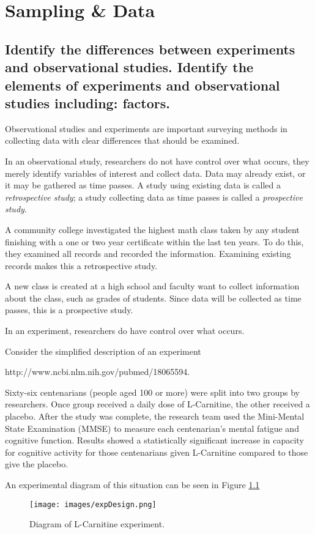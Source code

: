 \chapter{Sampling \& Data}

\section[Experiments \& Studies]{Identify the differences between experiments and observational studies. Identify the elements of experiments and observational studies including: factors.}

Observational studies and experiments are important surveying methods in collecting data with clear differences that should be examined.  

In an observational study, researchers do not have control over what occurs, they merely identify variables of interest and collect data.  Data may already exist, or it may be gathered as time passes.  A study using existing data is called a \emph{retrospective study}; a study collecting data as time passes is called a \emph{prospective study}.

\begin{example} 
A community college investigated the highest math class taken by any student finishing with a one or two year certificate within the last ten years. To do this, they examined all records and recorded the information. 
Examining existing records makes this a retrospective study.
\end{example}

\begin{example}
A new class is created at a high school and faculty want to collect information about the class, such as grades of students. Since data will be collected as time passes, this is a prospective study.
\end{example}

In an experiment, researchers do have control over what occurs. 

\begin{example}
Consider the simplified description of an experiment 

{http://www.ncbi.nlm.nih.gov/pubmed/18065594}. 

Sixty-six centenarians (people aged 100 or more) were split into two groups by researchers.  Once group received a daily dose of L-Carnitine, the other received a placebo. After the study was complete, the research team used the Mini-Mental State Examination (MMSE) to measure each centenarian's mental fatigue and cognitive function. Results showed a statistically significant increase in capacity for cognitive activity for those centenarians given L-Carnitine compared to those give the placebo. 

An experimental diagram of this situation can be seen in Figure \ref{fig:expDesign} 

\begin{figure}
\centering
\texttt{[image: images/expDesign.png]}
\caption{Diagram of L-Carnitine experiment.}
\label{fig:expDesign}
\end{figure}

\end{example}

